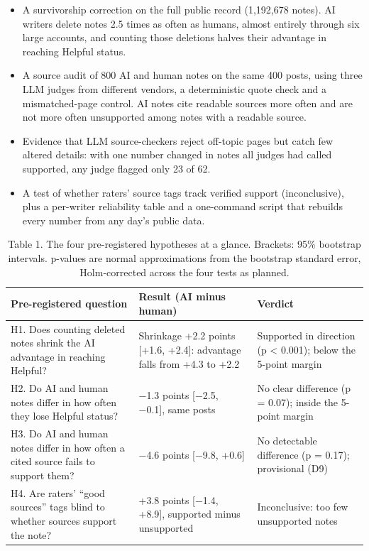 \documentclass[10.5pt]{article}
\begin{document}
\begin{itemize}
\item A survivorship correction on the full public record (1,192,678 notes). AI writers delete notes 2.5 times as often as humans, almost entirely through six large accounts, and counting those deletions halves their advantage in reaching Helpful status.
\item A source audit of 800 AI and human notes on the same 400 posts, using three LLM judges from different vendors, a deterministic quote check and a mismatched-page control. AI notes cite readable sources more often and are not more often unsupported among notes with a readable source.
\item Evidence that LLM source-checkers reject off-topic pages but catch few altered details: with one number changed in notes all judges had called supported, any judge flagged only 23 of 62.
\item A test of whether raters' source tags track verified support (inconclusive), plus a per-writer reliability table and a one-command script that rebuilds every number from any day's public data.
\end{itemize}
\begin{table}[htbp]\centering\small\renewcommand{\arraystretch}{1.25}\begin{tabularx}{\linewidth}{@{}>{\raggedright\arraybackslash}X>{\raggedright\arraybackslash}X>{\raggedright\arraybackslash}X@{}}\toprule
\textbf{\sffamily Pre-registered question} & \textbf{\sffamily Result (AI minus human)} & \textbf{\sffamily Verdict}\\\midrule
H1. Does counting deleted notes shrink the AI advantage in reaching Helpful? & Shrinkage +2.2 points [+1.6, +2.4]: advantage falls from +4.3 to +2.2 & Supported in direction (p < 0.001); below the 5-point margin\\
H2. Do AI and human notes differ in how often they lose Helpful status? & −1.3 points [−2.5, −0.1], same posts & No clear difference (p = 0.07); inside the 5-point margin\\
H3. Do AI and human notes differ in how often a cited source fails to support them? & −4.6 points [−9.8, +0.6] & No detectable difference (p = 0.17); provisional (D9)\\
H4. Are raters' ``good sources'' tags blind to whether sources support the note? & +3.8 points [−1.4, +8.9], supported minus unsupported & Inconclusive: too few unsupported notes\\
\bottomrule\end{tabularx}\caption{Table 1. The four pre-registered hypotheses at a glance. Brackets: 95\% bootstrap intervals. p-values are normal approximations from the bootstrap standard error, Holm-corrected across the four tests as planned.}\end{table}
\end{document}
